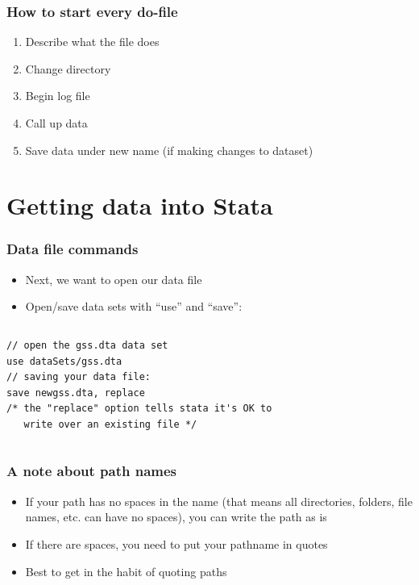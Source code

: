 \documentclass[table]{beamer}
\begin{document}
\begin{frame}
\frametitle{How to start every do-file}
\label{sec-1-11}

\begin{enumerate}
\item Describe what the file does
\item Change directory
\item Begin log file
\item Call up data
\item Save data under new name (if making changes to dataset)
\end{enumerate}
\end{frame}
\section{Getting data into Stata}
\label{sec-2}
\begin{frame}[fragile]
\frametitle{Data file commands}
\label{sec-2-1}

\begin{itemize}
\item Next, we want to open our data file
\item Open/save data sets with ``use'' and ``save'':
\end{itemize}

\vspace{-.5em} \begin{columns}  \begin{block}{}

\begin{verbatim}
// open the gss.dta data set
use dataSets/gss.dta
// saving your data file:
save newgss.dta, replace
/* the "replace" option tells stata it's OK to 
   write over an existing file */
\end{verbatim}

\end{block} \end{columns}
\end{frame}
\begin{frame}
\frametitle{A note about path names}
\label{sec-2-2}

\begin{itemize}
\item If your path has no spaces in the name (that means all directories, folders, file names, etc. can have no spaces), you can write the path as is
\item If there are spaces, you need to put your pathname in quotes
\item Best to get in the habit of quoting paths
\end{itemize}
 
\end{frame}
\end{document}
